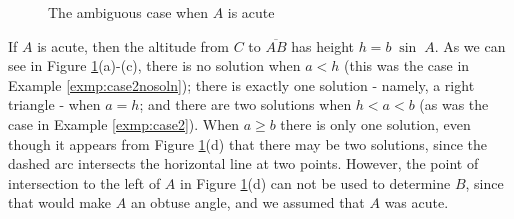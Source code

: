 \begin{figure}[h]
{}
 \qquad\qquad
 \vspace{-2mm}
 \caption[]{\quad The ambiguous case when $A$ is acute}
 \label{fig:ambiguous}
\end{figure}\vspace{-1mm}

If $A$ is acute, then the altitude from $C$ to $\overline{AB}$ has height $h = b\;\sin\;A$. As we
can see in Figure \ref{fig:ambiguous}(a)-(c), there is no solution when $a < h$ (this was the case
in Example \ref{exmp:case2nosoln}); there is exactly one solution - namely, a right triangle - when
$a = h$; and there are two solutions when $h < a < b$ (as was the case in Example \ref{exmp:case2}).
When $a \ge b$ there is only one solution, even though it appears from Figure \ref{fig:ambiguous}(d)
that there may be two solutions, since the dashed arc intersects the horizontal line at two points.
However, the point of intersection to the left of $A$ in Figure \ref{fig:ambiguous}(d) can not be
used to determine $B$, since that would make $A$ an obtuse angle, and we assumed that $A$ was acute.

